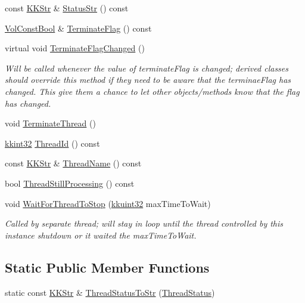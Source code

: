 \begin{DoxyCompactItemize}
\item 
const \hyperlink{class_k_k_b_1_1_k_k_str}{K\+K\+Str} \& \hyperlink{class_k_k_b_1_1_k_k_thread_a7a1d208bb108a4bbd2e19fe9b0657428}{Status\+Str} () const 
\item 
\hyperlink{namespace_k_k_b_a7d390f568e2831fb76b86b56c87bf92f}{Vol\+Const\+Bool} \& \hyperlink{class_k_k_b_1_1_k_k_thread_a188ecbf965ed6a19e5c16e9ae0127652}{Terminate\+Flag} () const 
\item 
virtual void \hyperlink{class_k_k_b_1_1_k_k_thread_aae645d31ef55a539e83b0309b316de07}{Terminate\+Flag\+Changed} ()
\begin{DoxyCompactList}\small\item\em Will be called whenever the value of \textquotesingle{}terminate\+Flag\textquotesingle{} is changed; derived classes should override this method if they need to be aware that the terminae\+Flag has changed. This give them a chance to let other objects/methods know that the flag has changed. \end{DoxyCompactList}\item 
void \hyperlink{class_k_k_b_1_1_k_k_thread_ad8ce909fbb09ad87c759e7a442530a08}{Terminate\+Thread} ()
\item 
\hyperlink{namespace_k_k_b_a8fa4952cc84fda1de4bec1fbdd8d5b1b}{kkint32} \hyperlink{class_k_k_b_1_1_k_k_thread_a31fa88422cee1e9c7c197a90cf508073}{Thread\+Id} () const 
\item 
const \hyperlink{class_k_k_b_1_1_k_k_str}{K\+K\+Str} \& \hyperlink{class_k_k_b_1_1_k_k_thread_a547e53d47818a4de7d367ce58203ade9}{Thread\+Name} () const 
\item 
bool \hyperlink{class_k_k_b_1_1_k_k_thread_af13369365be9c420e142d121f910c5c1}{Thread\+Still\+Processing} () const 
\item 
void \hyperlink{class_k_k_b_1_1_k_k_thread_aaca46f2589c1c14e207900575bcabae7}{Wait\+For\+Thread\+To\+Stop} (\hyperlink{namespace_k_k_b_af8d832f05c54994a1cce25bd5743e19a}{kkuint32} max\+Time\+To\+Wait)
\begin{DoxyCompactList}\small\item\em Called by separate thread; will stay in loop until the thread controlled by this instance shutdown or it waited the \textquotesingle{}max\+Time\+To\+Wait\textquotesingle{}. \end{DoxyCompactList}\end{DoxyCompactItemize}
\subsection*{Static Public Member Functions}
\begin{DoxyCompactItemize}
\item 
static const \hyperlink{class_k_k_b_1_1_k_k_str}{K\+K\+Str} \& \hyperlink{class_k_k_b_1_1_k_k_thread_a7a111deabee84c8aed46022bffb0574f}{Thread\+Status\+To\+Str} (\hyperlink{class_k_k_b_1_1_k_k_thread_a3f72bb1988ae5dd353b39260ae0acc72}{Thread\+Status})
\end{DoxyCompactItemize}
